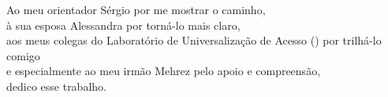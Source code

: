 \pretextualchapter{}

\vspace{8cm}

\begin{flushright}
\hfill \textnormal{
Ao meu orientador Sérgio por me mostrar o caminho,\\
à sua esposa Alessandra por torná-lo mais claro, \\
aos meus colegas do Laboratório de Universalização de Acesso () por trilhá-lo comigo\\
e especialmente ao meu irmão Mehrez pelo apoio e compreensão, \\
dedico esse trabalho.}
\end{flushright}
